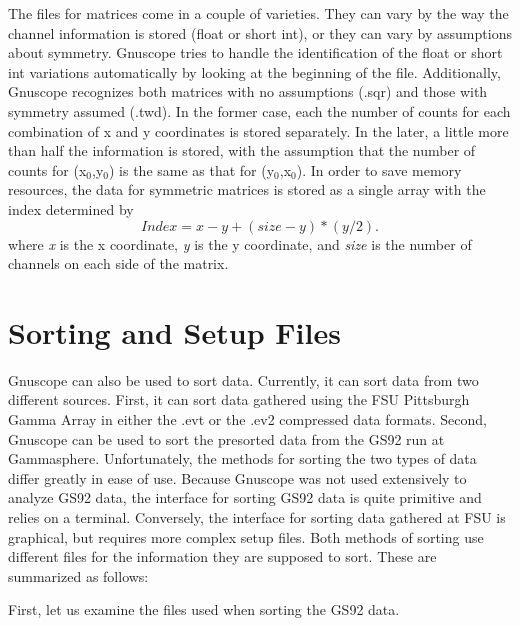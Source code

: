 The files for matrices come in a couple of varieties.  They can vary by the way the channel information is stored (float or short int), or they can vary by assumptions about symmetry.  Gnuscope tries to handle the identification of the float or short int variations automatically by looking at the beginning of the file.  Additionally, Gnuscope recognizes both matrices with no assumptions (.sqr) and those with symmetry assumed (.twd).  In the former case, each the number of counts for each combination of x and y coordinates is stored separately.  In the later, a little more than half the information is stored, with the assumption that the number of counts for (x$_0$,y$_0$) is the same as that for (y$_0$,x$_0$).  In order to save memory resources, the data for symmetric matrices is stored as a single array with the index determined by
\begin{equation}
Index = x - y + (size - y) * (y / 2).
\end{equation}
where {\it x} is the x coordinate, {\it y} is the y coordinate, and {\it size} is the number of channels on each side of the matrix.

\section{Sorting and Setup Files}

Gnuscope can also be used to sort data.  Currently, it can sort data from two different sources.  First, it can sort data gathered using the FSU Pittsburgh Gamma Array in either the .evt or the .ev2 compressed data formats.  Second, Gnuscope can be used to sort the presorted data from the GS92 run at {\sc Gammasphere}.  Unfortunately, the methods for sorting the two types of data differ greatly in ease of use.  Because Gnuscope was not used extensively to analyze GS92 data, the interface for sorting GS92 data is quite primitive and relies on a terminal.  Conversely, the interface for sorting data gathered at FSU is graphical, but requires more complex setup files.  Both methods of sorting use different files for the information they are supposed to sort.  These are summarized as follows:

First, let us examine the files used when sorting the GS92 data.

